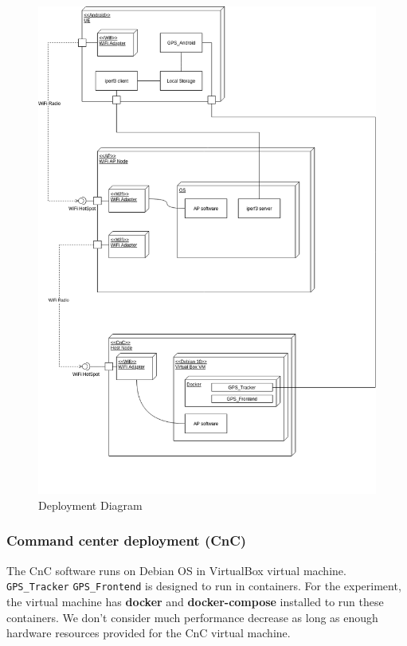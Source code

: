\begin{figure}[H]
\centering
\includegraphics[width=\linewidth, keepaspectratio]{images/Deployment Diagram-Deployment_Diagram.png}
\caption{Deployment Diagram}
\label{fig:deployment-diagram}
\end{figure}

\hypertarget{command-center-deployment-cnc}{%
\subsubsection{Command center deployment
(CnC)}\label{command-center-deployment-cnc}}

The CnC software runs on Debian OS in VirtualBox virtual machine.
\texttt{GPS\_Tracker} \texttt{GPS\_Frontend} is designed to run in
containers. For the experiment, the virtual machine has \textbf{docker}
and \textbf{docker-compose} installed to run these containers. We don't
consider much performance decrease as long as enough hardware resources
provided for the CnC virtual machine.


